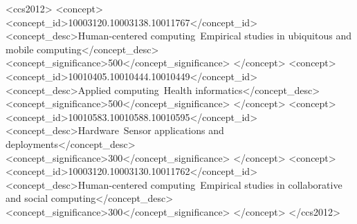 
\begin{CCSXML}
<ccs2012>
   <concept>
       <concept_id>10003120.10003138.10011767</concept_id>
       <concept_desc>Human-centered computing~Empirical studies in ubiquitous and mobile computing</concept_desc>
       <concept_significance>500</concept_significance>
       </concept>
   <concept>
       <concept_id>10010405.10010444.10010449</concept_id>
       <concept_desc>Applied computing~Health informatics</concept_desc>
       <concept_significance>500</concept_significance>
       </concept>
   <concept>
       <concept_id>10010583.10010588.10010595</concept_id>
       <concept_desc>Hardware~Sensor applications and deployments</concept_desc>
       <concept_significance>300</concept_significance>
       </concept>
   <concept>
       <concept_id>10003120.10003130.10011762</concept_id>
       <concept_desc>Human-centered computing~Empirical studies in collaborative and social computing</concept_desc>
       <concept_significance>300</concept_significance>
       </concept>
 </ccs2012>
\end{CCSXML}





